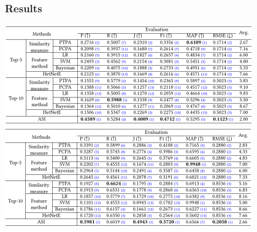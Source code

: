 \begin{frame}
\frametitle{Results}
\centering
{}\includegraphics[width=0.8\textwidth]{img/aminer1}
\includegraphics[width=0.8\textwidth]{img/aminer2}



\end{frame}
